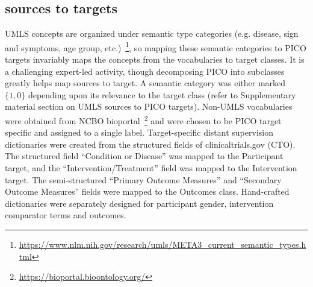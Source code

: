 \documentclass[10.7pt,]{article}
\begin{document}
\subsection{sources to targets}\label{s2t}
%
UMLS concepts are organized under semantic type categories (e.g. disease, sign and symptoms, age group, etc.)~\footnote{\url{https://www.nlm.nih.gov/research/umls/META3_current_semantic_types.html}}, so mapping these semantic categories to PICO targets invariably maps the concepts from the vocabularies to target classes.
It is a challenging expert-led activity, though decomposing PICO into subclasses greatly helps map sources to target.
A semantic category was either marked $\{1, 0\}$ depending upon its relevance to the target class (refer to Supplementary material section on UMLS sources to PICO targets).
Non-UMLS vocabularies were obtained from NCBO bioportal~\footnote{\url{https://bioportal.bioontology.org/}} and were chosen to be PICO target specific and assigned to a single label.
Target-specific distant supervision dictionaries were created from the structured fields of clinicaltrials.gov (CTO). 
The structured field ``Condition or Disease'' was mapped to the Participant target, and the ``Intervention/Treatment'' field was mapped to the Intervention target.
The semi-structured ``Primary Outcome Measures'' and ``Secondary Outcome Measures'' fields were mapped to the Outcomes class.
Hand-crafted dictionaries were separately designed for participant gender, intervention comparator terms and outcomes.
%
%
%
\end{document}
